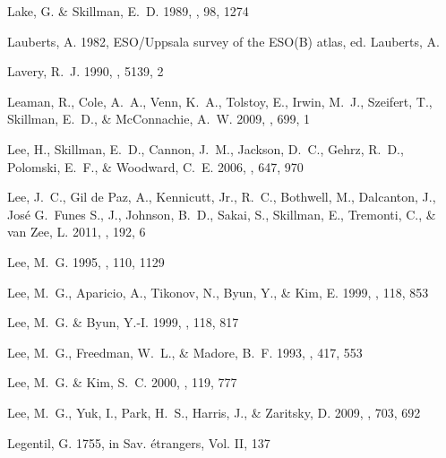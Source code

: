 \documentclass[manuscript]{aastex}
\begin{document}
\begin{thebibliography}{381}
{Lake}, G. \& {Skillman}, E.~D. 1989, \aj, 98, 1274

{Lauberts}, A. 1982, {ESO/Uppsala survey of the ESO(B) atlas}, ed. {Lauberts,
  A.}

{Lavery}, R.~J. 1990, \iaucirc, 5139, 2

{Leaman}, R., {Cole}, A.~A., {Venn}, K.~A., {Tolstoy}, E., {Irwin}, M.~J.,
  {Szeifert}, T., {Skillman}, E.~D., \& {McConnachie}, A.~W. 2009, \apj, 699, 1

{Lee}, H., {Skillman}, E.~D., {Cannon}, J.~M., {Jackson}, D.~C., {Gehrz},
  R.~D., {Polomski}, E.~F., \& {Woodward}, C.~E. 2006, \apj, 647, 970

{Lee}, J.~C., {Gil de Paz}, A., {Kennicutt}, Jr., R.~C., {Bothwell}, M.,
  {Dalcanton}, J., {Jos{\'e} G.~Funes S.}, J., {Johnson}, B.~D., {Sakai}, S.,
  {Skillman}, E., {Tremonti}, C., \& {van Zee}, L. 2011, \apjs, 192, 6

{Lee}, M.~G. 1995, \aj, 110, 1129

{Lee}, M.~G., {Aparicio}, A., {Tikonov}, N., {Byun}, Y., \& {Kim}, E. 1999,
  \aj, 118, 853

{Lee}, M.~G. \& {Byun}, Y.-I. 1999, \aj, 118, 817

{Lee}, M.~G., {Freedman}, W.~L., \& {Madore}, B.~F. 1993, \apj, 417, 553

{Lee}, M.~G. \& {Kim}, S.~C. 2000, \aj, 119, 777

{Lee}, M.~G., {Yuk}, I., {Park}, H.~S., {Harris}, J., \& {Zaritsky}, D. 2009,
  \apj, 703, 692

{Legentil}, G. 1755, in Sav. {\'e}trangers, Vol. II, 137


\end{thebibliography}
\end{document}
